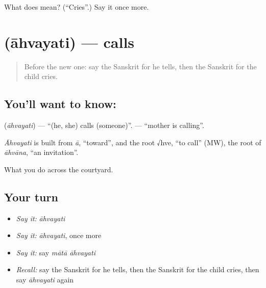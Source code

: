 \begin{tcolorbox}[breakable,colback=teal!4,colframe=teal!35!black,title={Before you move on}]
What does  mean? (\textquotedblleft{}Cries\textquotedblright{}.) Say it once more.
\end{tcolorbox}
\section[\texorpdfstring{\sk{आह्वयति} (āhvayati)}{आह्वयति (āhvayati)}]{ (āhvayati) — calls}

\label{lesson:SA-C73-calls}



\begin{quote}
Before the new one: say the Sanskrit for he tells, then the Sanskrit for the child cries.
\end{quote}

\subsection*{You'll want to know: }
\textbf{} (\emph{āhvayati}) — \textquotedblleft{}(he, she) calls (someone)\textquotedblright{}. \textbf{ } — \textquotedblleft{}mother is calling\textquotedblright{}.

\begin{cousinweb}
\emph{Āhvayati} is built from \emph{ā}, \textquotedblleft{}toward\textquotedblright{}, and the root √hve, \textquotedblleft{}to call\textquotedblright{} (MW), the root of \emph{āhvāna}, \textquotedblleft{}an invitation\textquotedblright{}.
\end{cousinweb}

\begin{grammarlens}[title={What you've built}]
What you do across the courtyard.
\end{grammarlens}

\subsection*{Your turn}
\begin{itemize}
\raggedright
  \item \emph{Say it:} \emph{āhvayati}
  \item \emph{Say it:} \emph{āhvayati}, once more
  \item \emph{Say it:} say \emph{mātā āhvayati}
  \item \emph{Recall:} say the Sanskrit for he tells, then the Sanskrit for the child cries, then say \emph{āhvayati} again
\end{itemize}

